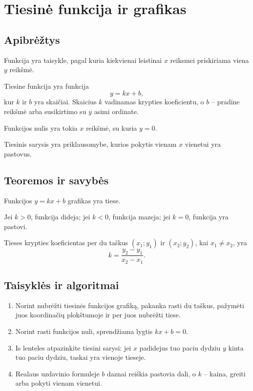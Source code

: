 \section{Tiesinė funkcija ir grafikas}\label{sec:tiesine-funkcija-ir-grafikas}

\subsection{Apibrėžtys}
\begin{apibreztis}
Funkcija yra taisykle, pagal kuria kiekvienai leistinai $x$ reiksmei priskiriama viena $y$ reikšmė.
\end{apibreztis}
\begin{apibreztis}
Tiesine funkcija yra funkcija
\[
y=kx+b,
\]
kur $k$ ir $b$ yra skaičiai. Skaicius $k$ vadinamas krypties koeficientu, o $b$ -- pradine reikšmė arba susikirtimo su $y$ asimi ordinate.
\end{apibreztis}
\begin{apibreztis}
Funkcijos nulis yra tokia $x$ reikšmė, su kuria $y=0$.
\end{apibreztis}
\begin{apibreztis}
Tiesinis sarysis yra priklausomybe, kurios pokytis vienam $x$ vienetui yra pastovus.
\end{apibreztis}

\subsection{Teoremos ir savybės}
\begin{savybe}
Funkcijos $y=kx+b$ grafikas yra tiese.
\end{savybe}
\begin{savybe}
Jei $k>0$, funkcija dideja; jei $k<0$, funkcija mazeja; jei $k=0$, funkcija yra pastovi.
\end{savybe}
\begin{savybe}
Tieses krypties koeficientas per du taškus $(x_1;y_1)$ ir $(x_2;y_2)$, kai $x_1\ne x_2$, yra
\[
k=\frac{y_2-y_1}{x_2-x_1}.
\]
\end{savybe}

\subsection{Taisyklės ir algoritmai}
\begin{enumerate}[label=\arabic*.]
\item Norint nubrėžti tiesinės funkcijos grafiką, pakanka rasti du taškus, pažymėti juos koordinačių plokštumoje ir per juos nubrėžti tiese.
\item Norint rasti funkcijos nuli, sprendžiama lygtis $kx+b=0$.
\item Is lenteles atpazinkite tiesini sarysi: jei $x$ padidejus tuo paciu dydziu $y$ kinta tuo paciu dydziu, taskai yra vienoje tieseje.
\item Realaus uzdavinio formuleje $b$ daznai reiškia pastovia dali, o $k$ -- kaina, greiti arba pokyti vienam vienetui.
\end{enumerate}
